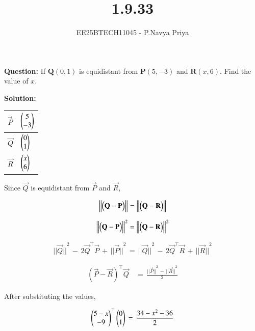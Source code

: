 \documentclass[journal,12pt,onecolumn]{IEEEtran}
\theoremstyle{remark}
\begin{document}
\title{1.9.33}
\author{EE25BTECH11045 - P.Navya Priya}
\maketitle
\renewcommand{\thefigure}{\theenumi}
\renewcommand{\thetable}{\theenumi}

\textbf{Question:} If $\textbf{Q}(0,1)$ is equidistant from $\textbf{P}(5,-3)$ and $\textbf{R}(x,6)$. Find the value of $x$.
\vspace{0.5cm}

\textbf{Solution:}
\begin{table}[H]
\centering
\renewcommand{\arraystretch}{1.5}
\begin{tabular}{|m{1cm}|m{1cm}|}
\hline
  $\vec{P}$   &  $\begin{pmatrix}5\\-3\end{pmatrix}$ \\ \hline 
  $\vec{Q}$   &  $\begin{pmatrix}0\\1\end{pmatrix}$ \\ \hline
  $\vec{R}$   &  $\begin{pmatrix}x\\6\end{pmatrix}$ \\ \hline
\end{tabular}
\end{table}

Since $\vec{Q}$ is equidistant from $\vec{P}$ and $\vec{R}$,

\begin{align}
    \left\lVert\begin{pmatrix}\mathbf{Q} - \mathbf{P}\end{pmatrix}\right\rVert = \left\lVert\begin{pmatrix}\mathbf{Q} - \mathbf{R}\end{pmatrix}\right\rVert
\end{align}

\begin{align}
     \left\lVert\begin{pmatrix}\mathbf{Q} - \mathbf{P}\end{pmatrix}\right\rVert^2 = \left\lVert\begin{pmatrix}\mathbf{Q} - \mathbf{R}\end{pmatrix}\right\rVert^2
\end{align}

\begin{align}
 {||\vec{Q}||}^2 \, - \, 2\vec{Q}^\top\vec{P} \, + \, {||\vec{P}||}^2 \, = \, {||\vec{Q}||}^2 \, - \, 2\vec{Q}^\top\vec{R} \, + \, {||\vec{R}||}^2
\end{align}

\begin{align}
    {(\vec{P} - \vec{R})}^\top \vec{Q} \, &= \, \frac{{||\vec{P}||}^2\, - \, {||\vec{R}||}^2}{2}
\end{align}

After substituting the values,

\begin{align}
    \begin{pmatrix}5-x\\-9\end{pmatrix}^\top\begin{pmatrix}0\\1\end{pmatrix}\, = \, \frac{34-x^2-36}{2}
\end{align}
\end{document}

